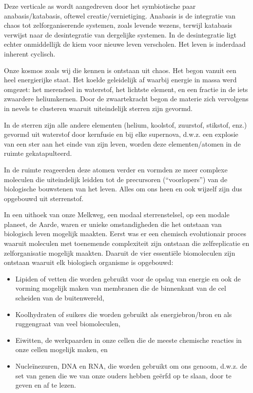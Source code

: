 \documentclass[
  11pt,
]{book}
\providecommand{\tightlist}{%
  \setlength{\itemsep}{0pt}\setlength{\parskip}{0pt}}
\begin{document}
Deze verticale as wordt aangedreven door het symbiotische paar anabasis/katabasis, oftewel creatie/vernietiging. Anabasis is de integratie van chaos tot zelforganiserende systemen, zoals levende wezens, terwijl katabasis verwijst naar de desintegratie van dergelijke systemen. In de desintegratie ligt echter onmiddellijk de kiem voor nieuwe leven verscholen. Het leven is inderdaad inherent cyclisch.

Onze kosmos zoals wij die kennen is ontstaan uit chaos. Het begon vanuit een heel energierijke staat. Het koelde geleidelijk af waarbij energie in massa werd omgezet: het merendeel in waterstof, het lichtste element, en een fractie in de iets zwaardere heliumkernen. Door de zwaartekracht begon de materie zich vervolgens in nevels te clusteren waaruit uiteindelijk sterren zijn gevormd.

In de sterren zijn alle andere elementen (helium, koolstof, zuurstof, stikstof, enz.) gevormd uit waterstof door kernfusie en bij elke supernova, d.w.z. een explosie van een ster aan het einde van zijn leven, worden deze elementen/atomen in de ruimte gekatapulteerd.

In de ruimte reageerden deze atomen verder en vormden ze meer complexe moleculen die uiteindelijk leidden tot de precursoren (``voorlopers'') van de biologische bouwstenen van het leven. Alles om ons heen en ook wijzelf zijn dus opgebouwd uit sterrenstof.

In een uithoek van onze Melkweg, een modaal sterrenstelsel, op een modale planeet, de Aarde, waren er unieke omstandigheden die het ontstaan van biologisch leven mogelijk maakten. Eerst was er een chemisch evolutionair proces waaruit moleculen met toenemende complexiteit zijn ontstaan die zelfreplicatie en zelforganisatie mogelijk maakten. Daaruit de vier essentiële biomoleculen zijn ontstaan waaruit elk biologisch organisme is opgebouwd:

\begin{itemize}
\tightlist
\item
  Lipiden of vetten die worden gebruikt voor de opslag van energie en ook de vorming mogelijk maken van membranen die de binnenkant van de cel scheiden van de buitenwereld,
\item
  Koolhydraten of suikers die worden gebruikt als energiebron/bron en als ruggengraat van veel biomoleculen,
\item
  Eiwitten, de werkpaarden in onze cellen die de meeste chemische reacties in onze cellen mogelijk maken, en
\item
  Nucleïnezuren, DNA en RNA, die worden gebruikt om ons genoom, d.w.z. de set van genen die we van onze ouders hebben geërfd op te slaan, door te geven en af te lezen.
\end{itemize}
\end{document}
